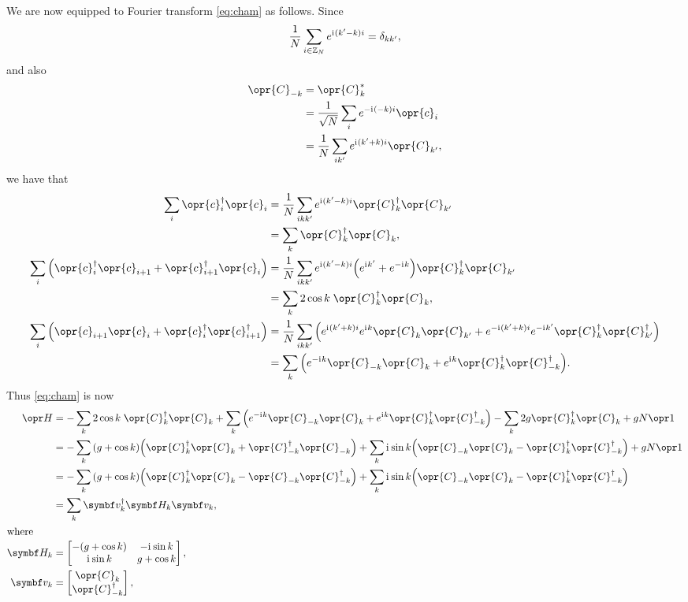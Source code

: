 \documentclass[../thesis.tex]{subfiles}
\begin{document}
We are now equipped to Fourier transform \cref{eq:cham} as follows. Since
\begin{equation}
  \frac{1}{N}\sum_{i\in\mathbb{Z}_N} e^{\mathrm{i}\mkern1mu(k' - k) i}
  = \delta_{kk'},
\end{equation}
and also
\begin{align}
  \opr{C}_{-k}
  &= \opr{C}_k^* \\
  &= \frac{1}{\sqrt{N}} \sum_i e^{-\im (-k)i} \opr{c}_i \\
  &= \frac{1}{N}\sum_{ik'} e^{\im (k' + k)i} \opr{C}_{k'},
\end{align}
we have that
\begin{align}
  \sum_i \opr{c}_i^\dag\opr{c}_i
  &= \frac{1}{N}\sum_{ikk'} e^{\im (k' - k)i}
  \opr{C}_k^\dag \opr{C}_{k'} \\
  &= \sum_k \opr{C}_k^\dag \opr{C}_k,
  \\
  \sum_i \qty(\opr{c}_i^\dag\opr{c}_{i+1} + \opr{c}_{i+1}^\dag\opr{c}_i)
  &= \frac{1}{N}\sum_{ikk'} e^{\im (k' - k)i} \qty(%
  e^{\im k'} + e^{-\im k} 
  ) \opr{C}_k^\dag \opr{C}_{k'} \\
  &= \sum_k 2 \cos k\; \opr{C}_k^\dag \opr{C}_k,
  \\
  \sum_i \qty(\opr{c}_{i+1}\opr{c}_i + \opr{c}_i^\dag\opr{c}_{i+1}^\dag)
  &= \frac{1}{N}\sum_{ikk'} \qty(%
  e^{\im (k' + k)i} e^{\im k} \opr{C}_{k}\opr{C}_{k'}
  + e^{-\im (k' + k)i} e^{-\im k'} \opr{C}_{k}^\dag\opr{C}_{k'}^\dag
  ) \\
  &= \sum_k \qty(%
  e^{-\im k} \opr{C}_{-k} \opr{C}_k
  + e^{\im k} \opr{C}_k^\dag \opr{C}_{-k}^\dag
  ).
\end{align}
Thus \cref{eq:cham} is now
\begin{align}
  \ham
  &= -\sum_k 2 \cos k\; \opr{C}_k^\dag \opr{C}_k
  + \sum_k \qty(%
  e^{-\im k} \opr{C}_{-k} \opr{C}_k
  + e^{\im k} \opr{C}_k^\dag \opr{C}_{-k}^\dag
  )
  - \sum_k 2g\opr{C}_k^\dag\opr{C}_k
  + g N \idopr
  \\
  &= -\sum_k \qty(g + \cos k)
  \qty(%
  \opr{C}_k^\dag \opr{C}_k
  + \opr{C}_{-k}^\dag \opr{C}_{-k}
  )
  + \sum_k \im\sin k
  \qty(%
  \opr{C}_{-k}\opr{C}_k
  - \opr{C}_k^\dag\opr{C}_{-k}^\dag
  )
  + g N \idopr
  \\
  &= -\sum_k \qty(g + \cos k)
  \qty(%
  \opr{C}_k^\dag \opr{C}_k
  - \opr{C}_{-k} \opr{C}_{-k}^\dag
  )
  + \sum_k \im\sin k
  \qty(%
  \opr{C}_{-k}\opr{C}_k
  - \opr{C}_k^\dag\opr{C}_{-k}^\dag
  ) \\
  &= \sum_k \vq{v}_k^\dag \mq{H}_k \vq{v}_k,
  \label{eq:Cham} \\
  \shortintertext{where}
  \mq{H}_k
  &= \bmqty{%
  -(g + \cos k) & -\im\sin k \\
  \im\sin k & g + \cos k
  }, \\
  \vq{v}_k
  &= \bmqty{\opr{C}_k \\ \opr{C}_{-k}^\dag},
\end{align}
\end{document}
